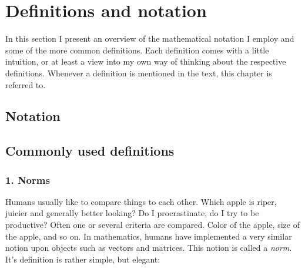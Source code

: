 \chapter*{Definitions and notation}

In this section I present an overview of the mathematical 
notation I employ and some of the more common definitions.
Each definition comes with a little intuition, or at least
a view into my own way of thinking about the respective 
definitions. Whenever a definition is mentioned in the text,
this chapter is referred to.

\section*{Notation}

\section*{Commonly used definitions}

\subsection*{1. Norms}
Humans usually like to compare things to each other.
Which apple is riper, juicier and generally better looking?
Do I procrastinate, do I try to be productive? Often one or 
several criteria are compared. Color of the apple, size of 
the apple, and so on. In mathematics, humans have implemented 
a very similar notion upon objects such as vectors and matrices. 
This notion is called a \textit{norm}. It's definition is 
rather simple, but elegant:

